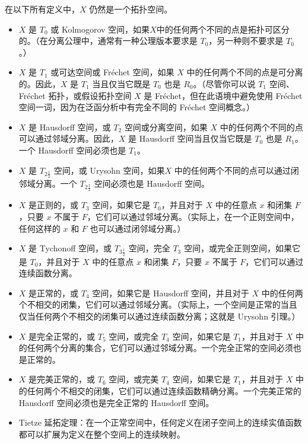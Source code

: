 在以下所有定义中，$X$ 仍然是一个拓扑空间。
\begin{itemize}
\item $X$ 是 $T_0$ 或 Kolmogorov 空间，如果$X$中的任何两个不同的点是拓扑可区分的。（在分离公理中，通常有一种公理版本要求是 $T_0$，另一种则不要求是 $T_0$。）
\item $X$ 是 $T_1$ 或可达空间或 Fréchet 空间，如果 $X$ 中的任何两个不同的点是可分离的。因此，$X$ 是 $T_1$ 当且仅当它既是 $T_0$ 也是 $R_0$。（尽管你可以说 $T_1$ 空间、Fréchet 拓扑，或假设拓扑空间 $X$ 是 Fréchet，但在此语境中避免使用 Fréchet 空间一词，因为在泛函分析中有完全不同的 Fréchet 空间概念。）
\item $X$ 是 Hausdorff 空间，或 $T_2$ 空间或分离空间，如果 $X$ 中的任何两个不同的点可以通过邻域分离。因此，$X$ 是 Hausdorff 空间当且仅当它既是 $T_0$ 也是 $R_1$。一个 Hausdorff 空间必须也是 $T_1$。
\item $X$ 是 $T_{2\frac{1}{2}}$ 空间，或 Urysohn 空间，如果$X$ 中的任何两个不同的点可以通过闭邻域分离。一个 $T_{2\frac{1}{2}}$ 空间必须也是 Hausdorff 空间。
\item $X$ 是正则的，或 $T_3$ 空间，如果它是 $T_0$，并且对于 $X$ 中的任意点 $x$ 和闭集 $F$，只要 $x$ 不属于 $F$，它们可以通过邻域分离。（实际上，在一个正则空间中，任何这样的 $x$ 和 $F$ 也可以通过闭邻域分离。）
\item $X$ 是 Tychonoff 空间，或 $T_{3\frac{1}{2}}$ 空间，完全 $T_3$ 空间，或完全正则空间，如果它是 $T_0$，并且对于 $X$ 中的任意点 $x$ 和闭集 $F$，只要 $x$ 不属于 $F$，它们可以通过连续函数分离。
\item $X$ 是正常的，或 $T_4$ 空间，如果它是 Hausdorff 空间，并且对于 $X$ 中的任何两个不相交的闭集，它们可以通过邻域分离。（实际上，一个空间是正常的当且仅当任何两个不相交的闭集可以通过连续函数分离；这就是 Urysohn 引理。）
\item $X$ 是完全正常的，或 $T_5$ 空间，或完全 $T_4$ 空间，如果它是 $T_1$，并且对于 $X$ 中的任何两个分离的集合，它们可以通过邻域分离。一个完全正常的空间必须也是正常的。
\item $X$ 是完美正常的，或 $T_6$ 空间，或完美 $T_4$ 空间，如果它是 $T_1$，并且对于 $X$ 中的任何两个不相交的闭集，它们可以通过连续函数精确分离。一个完美正常的 Hausdorff 空间必须也是完全正常的 Hausdorff 空间。
\item Tietze 延拓定理：在一个正常空间中，任何定义在闭子空间上的连续实值函数都可以扩展为定义在整个空间上的连续映射。
\end{itemize}